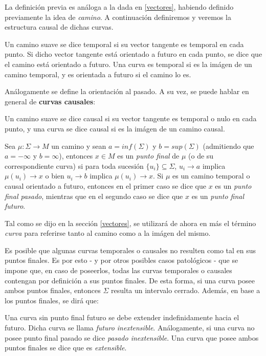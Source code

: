 La definición previa es análoga a la dada en \ref{vectores}, habiendo definido previamente la idea de \textit{camino}. A continuación definiremos y veremos la estructura causal de dichas curvas.

\begin{definition}
Un camino suave se dice temporal si su vector tangente es temporal en cada punto. Si dicho vector tangente está orientado a futuro en cada punto, se dice que el camino está orientado a futuro. Una curva es temporal si es la imágen de un camino temporal, y es orientada a futuro si el camino lo es. 
\end{definition}

Análogamente se define la orientación al pasado. A su vez, se puede hablar en general de \textbf{curvas causales}:

\begin{definition}
Un camino suave se dice causal si su vector tangente es temporal o nulo en cada punto, y una curva se dice causal si es la imágen de un camino causal.
\end{definition}

\begin{definition}
Sea $\mu:\Sigma \rightarrow M$ un camino y sean $a=inf(\Sigma)$ y $b=sup(\Sigma)$ (admitiendo que $a=-\infty$ y $b=\infty$), entonces $x\in M$ es un \textit{punto final} de $\mu$ (o de su correspondiente curva) si para toda sucesión $\{u_i\}\subseteq \Sigma$, $u_i\rightarrow a$ implica $\mu(u_i)\rightarrow x$ o bien $u_i\rightarrow b$ implica $\mu(u_i)\rightarrow x$. Si $\mu$ es un camino temporal o causal orientado a futuro, entonces en el primer caso se dice que $x$ es un \textit{punto final pasado}, mientras que en el segundo caso se dice que $x$ es un \textit{punto final futuro}.
\end{definition}

Tal como se dijo en la sección \ref{vectores}, se utilizará de ahora en más el término \textit{curva} para referirse tanto al camino como a la imágen del mismo. 

Es posible que algunas curvas temporales o causales no resulten como tal en sus puntos finales. Es por esto - y por otros posibles casos patológicos \citep{Penrose} - que se impone que, en caso de poseerlos, todas las curvas temporales o causales contengan por definición a sus puntos finales. De esta forma, si una curva posee ambos puntos finales, entonces $\Sigma$ resulta un intervalo cerrado. Además, en base a los puntos finales, se dirá que:

\begin{definition}
Una curva sin punto final futuro se debe extender indefinidamente hacia el futuro. Dicha curva se llama \textit{futuro inextensible}. Análogamente, si una curva no posee punto final pasado se dice \textit{pasado inextensible}. Una curva que posee ambos puntos finales se dice que es \textit{extensible}.
\end{definition}

